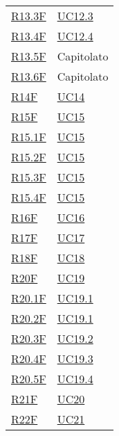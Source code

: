 \begin{center}
\begin{longtable}[!h]{p{50px} p{50px}}
        \hyperref[tab:RequisitiFunzionali]{R13.3F}   & \hyperref[sec:UC12.3]{UC12.3} \\
        \hyperref[tab:RequisitiFunzionali]{R13.4F}   & \hyperref[sec:UC12.4]{UC12.4} \\
        \hyperref[tab:RequisitiFunzionali]{R13.5F}   & Capitolato                    \\
        \hyperref[tab:RequisitiFunzionali]{R13.6F}   & Capitolato                    \\
        \hyperref[tab:RequisitiFunzionali]{R14F}     & \hyperref[sec:UC14]{UC14}     \\
        \hyperref[tab:RequisitiFunzionali]{R15F}     & \hyperref[sec:UC15]{UC15}     \\
        \hyperref[tab:RequisitiFunzionali]{R15.1F}   & \hyperref[sec:UC15]{UC15}     \\
        \hyperref[tab:RequisitiFunzionali]{R15.2F}   & \hyperref[sec:UC15]{UC15}     \\
        \hyperref[tab:RequisitiFunzionali]{R15.3F}   & \hyperref[sec:UC15]{UC15}     \\
        \hyperref[tab:RequisitiFunzionali]{R15.4F}   & \hyperref[sec:UC15]{UC15}     \\
        \hyperref[tab:RequisitiFunzionali]{R16F}     & \hyperref[sec:UC16]{UC16}     \\
        \hyperref[tab:RequisitiFunzionali]{R17F}     & \hyperref[sec:UC17]{UC17}     \\
        \hyperref[tab:RequisitiFunzionali]{R18F}     & \hyperref[sec:UC18]{UC18}     \\
        \hyperref[tab:RequisitiFunzionali]{R20F}     & \hyperref[sec:UC19]{UC19}     \\
        \hyperref[tab:RequisitiFunzionali]{R20.1F}   & \hyperref[sec:UC19.1]{UC19.1} \\
        \hyperref[tab:RequisitiFunzionali]{R20.2F}   & \hyperref[sec:UC19.1]{UC19.1} \\
        \hyperref[tab:RequisitiFunzionali]{R20.3F}   & \hyperref[sec:UC19.2]{UC19.2} \\
        \hyperref[tab:RequisitiFunzionali]{R20.4F}   & \hyperref[sec:UC19.3]{UC19.3} \\
        \hyperref[tab:RequisitiFunzionali]{R20.5F}   & \hyperref[sec:UC19.4]{UC19.4} \\
        \hyperref[tab:RequisitiFunzionali]{R21F}     & \hyperref[sec:UC20]{UC20}     \\
        \hyperref[tab:RequisitiFunzionali]{R22F}     & \hyperref[sec:UC21]{UC21}     \\

\end{longtable}
\end{center}
